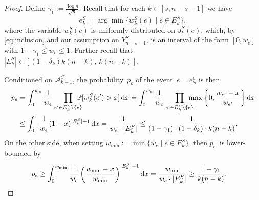 \documentclass[a4paper,11pt]{article}
\theoremstyle{definition}
\theoremstyle{plain}
\newcommand{\A}{\mathcal A}
\newcommand{\prob}{\mathbb{P}}
\newcommand{\w}{w}
\DeclarePairedDelimiter{\abs}{\lvert}{\rvert}
\DeclareMathOperator{\dd}{d\!} %
\begin{document}
\begin{proof}
  Define $\gamma_1 := \frac{\log n}{\sqrt{n}}$.
  Recall that for each $k \in [s, n-s-1]$ we have
  \[
    e^S_k = \arg\min \{ \w^S_k(e) \mid e \in E^S_k \},
  \]
  where the variable $\w^S_k(e)$ is uniformly distributed on $J_k^S(e)$,
  which, by \eqref{eq:inclusion} and our assumption on $Y^S_{n-s-1}$, is an interval of the form $[0, w_e]$ with $1-\gamma_1 \le w_e \le 1$.
  Further recall that $|E^S_k|\in[(1-\delta_k)k (n-k),\, k(n-k)]$.
  
  Conditioned on $\A_{k-1}^S$, the probability~$p_e$ of the event~$e = e_S^v$ is then
  \begin{align*}
    p_e &= \int_{0}^{w_e} \frac{1}{w_e} \prod_{e' \in E^S_k \setminus \{e\}} \hspace{-2ex} \prob[\w^S_k(e') > x] \dd x
    = \int_{0}^{w_e} \frac{1}{w_e} \prod_{e' \in E^S_k \setminus \{e\}} \hspace{-2ex} \max\left\{0, \frac{w_{e'} - x}{w_{e'}}\right\} \dd x
    \\
    &\leq \int_0^1 \frac{1}{w_e} (1-x)^{\abs{E^S_k}-1} \dd x
    = \frac{1}{w_e \cdot \abs{E^S_k}} \leq \frac{1}{(1-\gamma_1) \cdot (1-\delta_k) \cdot k (n-k)}.
  \end{align*}
  On the other side, when setting $w_{\min} := \min\{w_e \mid e \in E^S_k\}$, then $p_e$~is lower-bounded by
  \begin{align*}
    p_e &\geq \int_0^{w_{\min}} \frac{1}{w_e} \left(\frac{w_{\min} - x}{w_{\min}}\right)^{\abs{E^S_k}-1} \dd x
    = \frac{w_{\min}}{w_e \cdot \abs{E^S_k}}
    \geq \frac{1-\gamma_1}{k (n-k)}.
  \end{align*}
  

\end{proof}
\end{document}
